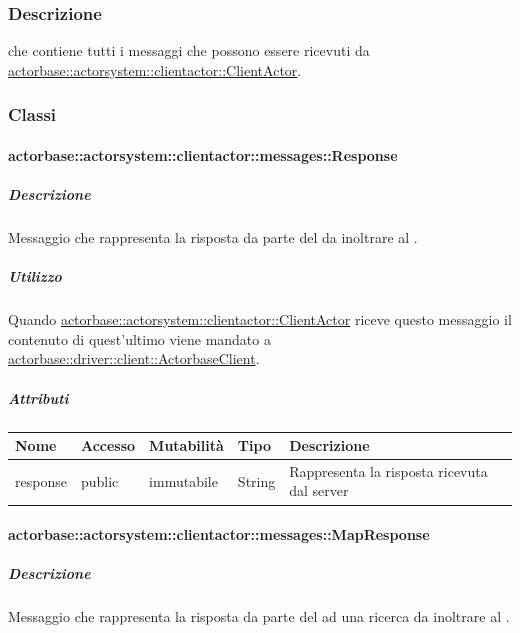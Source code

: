 \documentclass{scalatekids-article}
\begin{document}
\subsubsection{Descrizione}

 che contiene tutti i messaggi che possono essere ricevuti da
\hyperref[sec:actorbase::actorsystem::clientactor::ClientActor]{actorbase::actorsystem::clientactor::ClientActor}.

\subsubsection{Classi}

\paragraph{actorbase::actorsystem::clientactor::messages::Response}
\label{sec:actorbase::actorsystem::clientactor::messages::Response}

\subparagraph{Descrizione}

Messaggio che rappresenta la risposta da parte del  da inoltrare
al .

\subparagraph{Utilizzo}

Quando \hyperref[sec:actorbase::actorsystem::clientactor::ClientActor]{actorbase::actorsystem::clientactor::ClientActor}
riceve questo messaggio il contenuto di quest'ultimo viene
mandato a \hyperref[sec:actorbase::driver::client::ActorbaseClient]{actorbase::driver::\allowbreak{}client::\allowbreak{}ActorbaseClient}.

\subparagraph{Attributi}
\begin{tabular}{| p{3cm} | p{1.5cm} | p{2cm} | p{2cm} | p{8.5cm} |}
  \hline
  Nome & Accesso & Mutabilità & Tipo & Descrizione\\
  \hline
  response & public & immutabile & String & Rappresenta la risposta ricevuta dal server \\
  \hline
\end{tabular}

\paragraph{actorbase::actorsystem::clientactor::messages::MapResponse}
\label{sec:actorbase::actorsystem::clientactor::messages::MapResponse}

\subparagraph{Descrizione}

Messaggio che rappresenta la risposta da parte del  ad una ricerca da inoltrare
al .
\end{document}
